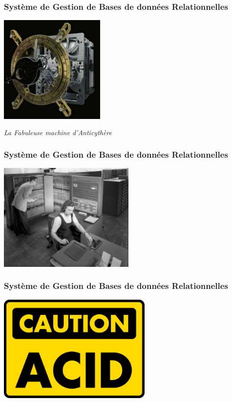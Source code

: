 \documentclass{beamer}
\begin{document}
\begin{frame}
  \frametitle{Système de Gestion de Bases de données Relationnelles}

  \begin{center}
    \includegraphics[height=2.1in]{anticy6.jpg}
  \end{center}

  \vfill
  \begin{center}
    \textit{La Fabuleuse machine d'Anticythère}
  \end{center}
\end{frame}

\begin{frame}
  \frametitle{Système de Gestion de Bases de données Relationnelles}

  \begin{center}
    \includegraphics[height=2.1in]{IBM_Electronic_Data_Processing_Machine_-_GPN-2000-001881.jpg}
  \end{center}
\end{frame}

\begin{frame}
  \frametitle{Système de Gestion de Bases de données Relationnelles}

  \begin{center}
    \includegraphics[height=2.1in]{caution_acid.png}
  \end{center}
\end{frame}
\end{document}
